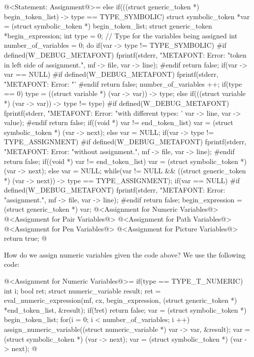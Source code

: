 \iniciocodigo
@<Statement: Assignment@>=
else if(((struct generic_token *) begin_token_list) -> type ==
        TYPE_SYMBOLIC){
  struct symbolic_token *var = (struct symbolic_token *) begin_token_list;
  struct generic_token *begin_expression;
  int type = 0; // Type for the variables being assigned
  int number_of_variables = 0;
  do{
    if(var -> type != TYPE_SYMBOLIC){
#if defined(W_DEBUG_METAFONT)
      fprintf(stderr, "METAFONT: Error: %
              "token in left side of assignment.\n", mf -> file,
              var -> line);
#endif
      return false;
    }
    if(var -> var == NULL){
#if defined(W_DEBUG_METAFONT)
      fprintf(stderr, "METAFONT: Error: %
              "'%
#endif
      return false;
    }
    number_of_variables ++;
    if(type == 0)
      type = ((struct variable *) (var -> var)) -> type;
    else if(((struct variable *) (var -> var)) -> type != type){
#if defined(W_DEBUG_METAFONT)
      fprintf(stderr, "METAFONT: Error: %
              "with different types: '%
              var -> line, var -> value);
#endif
      return false;
    }
    if((void *) var != end_token_list)
      var = (struct symbolic_token *) (var -> next);
    else
      var = NULL;
    if(var -> type != TYPE_ASSIGNMENT){
#if defined(W_DEBUG_METAFONT)
      fprintf(stderr, "METAFONT: Error: %
              "without assignment.\n", mf -> file, var -> line);
#endif
      return false;
    }
    if((void *) var != end_token_list)
      var = (struct symbolic_token *) (var -> next);
    else
      var = NULL;
  } while(var != NULL &&
          ((struct generic_token *) (var -> next)) -> type ==
          TYPE_ASSIGNMENT);
  if(var == NULL){
#if defined(W_DEBUG_METAFONT)
      fprintf(stderr, "METAFONT: Error: %
              "assignment.\n", mf -> file, var -> line);
#endif
      return false;
  }
  begin_expression = (struct generic_token *) var;
  @<Assignment for Numeric Variables@>
  @<Assignment for Pair Variables@>
  @<Assignment for Path Variables@>
  @<Assignment for Pen Variables@>
  @<Assignment for Picture Variables@>
  return true;
}
@
\fimcodigo


How do we assign numeric variables given the code above? We use the
following code:

\iniciocodigo
@<Assignment for Numeric Variables@>=
if(type == TYPE_T_NUMERIC){
  int i;
  bool ret;
  struct numeric_variable result;
  ret = eval_numeric_expression(mf, cx, begin_expression,
                               (struct generic_token *) *end_token_list,
                               &result);
  if(!ret)
    return false;
  var = (struct symbolic_token *) begin_token_list;
  for(i = 0; i < number_of_variables; i ++){
    assign_numeric_variable((struct numeric_variable *) var -> var,
                            &result);
    var = (struct symbolic_token *) (var -> next);
    var = (struct symbolic_token *) (var -> next);
  }
}
@
\fimcodigo

